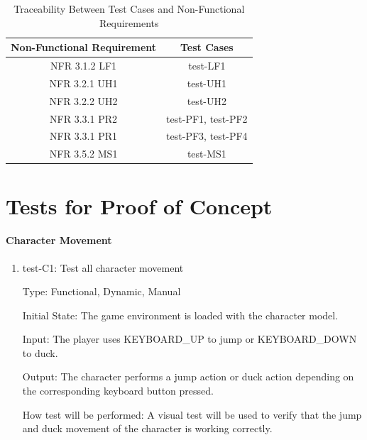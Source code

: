 \documentclass[12pt, titlepage]{article}
\begin{document}
\begin{table}[H]
  \begin{center}
    \caption{Traceability Between Test Cases and Non-Functional Requirements}
    \label{tab:table1}
    \begin{tabular}{c|c} 
        \toprule
        \textbf{Non-Functional Requirement} & \textbf{Test Cases}\\
        \midrule
        NFR 3.1.2 LF1 & test-LF1 \\
        \hline
        NFR 3.2.1 UH1 & test-UH1\\
        \hline
        NFR 3.2.2 UH2 & test-UH2\\
        \hline
        NFR 3.3.1 PR2 & test-PF1, test-PF2\\
        \hline
        NFR 3.3.1 PR1 & test-PF3, test-PF4\\
        \hline
        NFR 3.5.2 MS1 & test-MS1\\
        \bottomrule
    \end{tabular}
  \end{center}
\end{table}

\section{Tests for Proof of Concept}
		
\paragraph{Character Movement}

\begin{enumerate}

\item{test-C1: Test all character movement\\}

Type: Functional, Dynamic, Manual
					
Initial State: The game environment is loaded with the character model.
					
Input: The player uses KEYBOARD\_UP to jump or KEYBOARD\_DOWN to duck.
					
Output: The character performs a jump action or duck action depending on the corresponding keyboard button pressed.
					
How test will be performed: A visual test will be used to verify that the jump and duck movement of the character is working correctly.
\end{enumerate}
\end{document}

